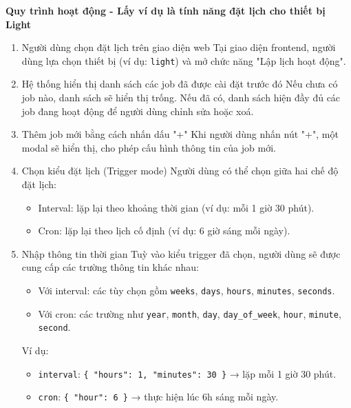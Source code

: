 \textbf{Quy trình hoạt động - Lấy ví dụ là tính năng đặt lịch cho thiết bị Light}

\begin{enumerate}
    \item Người dùng chọn đặt lịch trên giao diện web \newline
    Tại giao diện frontend, người dùng lựa chọn thiết bị (ví dụ: \texttt{light}) và mở chức năng "Lập lịch hoạt động".

    \item Hệ thống hiển thị danh sách các job đã được cài đặt trước đó \newline
    Nếu chưa có job nào, danh sách sẽ hiển thị trống. Nếu đã có, danh sách hiện đầy đủ các job đang hoạt động để người dùng chỉnh sửa hoặc xoá.

    \item Thêm job mới bằng cách nhấn dấu "+" \newline
    Khi người dùng nhấn nút "+", một modal sẽ hiển thị, cho phép cấu hình thông tin của job mới.

    \item Chọn kiểu đặt lịch (Trigger mode) \newline
    Người dùng có thể chọn giữa hai chế độ đặt lịch:
    \begin{itemize}
        \item Interval: lặp lại theo khoảng thời gian (ví dụ: mỗi 1 giờ 30 phút).
        \item Cron: lặp lại theo lịch cố định (ví dụ: 6 giờ sáng mỗi ngày).
    \end{itemize}

    \item Nhập thông tin thời gian \newline
    Tuỳ vào kiểu trigger đã chọn, người dùng sẽ được cung cấp các trường thông tin khác nhau:
    \begin{itemize}
        \item Với interval: các tùy chọn gồm \texttt{weeks}, \texttt{days}, \texttt{hours}, \texttt{minutes}, \texttt{seconds}.
        \item Với cron: các trường như \texttt{year}, \texttt{month}, \texttt{day}, \texttt{day\_of\_week}, \texttt{hour}, \texttt{minute}, \texttt{second}.
    \end{itemize}

    Ví dụ:
    \begin{itemize}
        \item \texttt{interval}: \texttt{\{ "hours": 1, "minutes": 30 \}} → lặp mỗi 1 giờ 30 phút.
        \item \texttt{cron}: \texttt{\{ "hour": 6 \}} → thực hiện lúc 6h sáng mỗi ngày.
    \end{itemize}



\end{enumerate}
